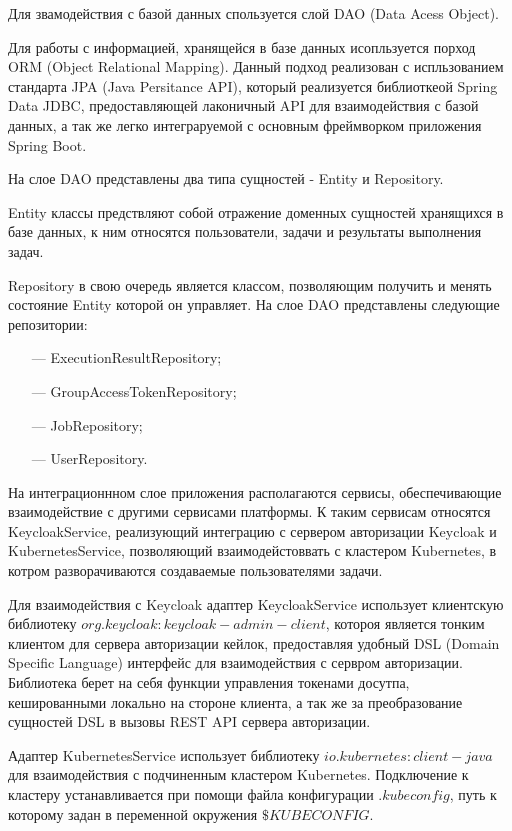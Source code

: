 Для звамодействия с базой данных спользуется слой DAO (Data Acess Object). 

Для работы с информацией, хранящейся в базе данных исопльзуется порход ORM (Object Relational Mapping)\cite{o2008object}. Данный подход реализован с испльзованием стандарта JPA (Java Persitance API)\cite{yang2010java}, который реализуется библиоткеой Spring Data JDBC, предоставляющей лаконичный API для взаимодействия с базой данных, а так же легко интеграруемой с основным фреймворком приложения Spring Boot.

На слое DAO представлены два типа сущностей - Entity и Repository.

Entity классы предствляют собой отражение доменных сущностей хранящихся в базе данных, к ним относятся пользователи, задачи и результаты выполнения задач. 

Repository в свою очередь является классом, позволяющим получить и менять состояние Entity которой он управляет. На слое DAO представлены следующие репозитории:

\begin{itemize}
\item[---]ExecutionResultRepository;
\item[---]GroupAccessTokenRepository;
\item[---]JobRepository;
\item[---]UserRepository.
\end{itemize}

На интеграционнном слое приложения располагаются сервисы, обеспечивающие взаимодействие с другими сервисами платформы. К таким сервисам относятся KeycloakService, реализующий интеграцию с сервером авторизации Keycloak и KubernetesService, позволяющий взаимодейстоввать с кластером Kubernetes, в котром разворачиваются создаваемые пользователями задачи.

Для взаимодействия с Keycloak адаптер KeycloakService использует клиентскую библиотеку $org.keycloak:keycloak-admin-client$, котороя является тонким клиентом для сервера авторизации кейлок, предоставляя удобный DSL (Domain Specific Language)\cite{mernik2005and} интерфейс для взаимодействия с сервром авторизации. Библиотека берет на себя функции управления токенами досутпа, кешированными локально на стороне клиента, а так же за преобразование сущностей DSL в вызовы REST API сервера авторизации.

Адаптер KubernetesService использует библиотеку $io.kubernetes:client-java$ для взаимодействия с подчиненным кластером Kubernetes. Подключение к кластеру устанавливается при помощи файла конфигурации $.kubeconfig$, путь к которому задан в переменной окружения $\$KUBECONFIG$.

